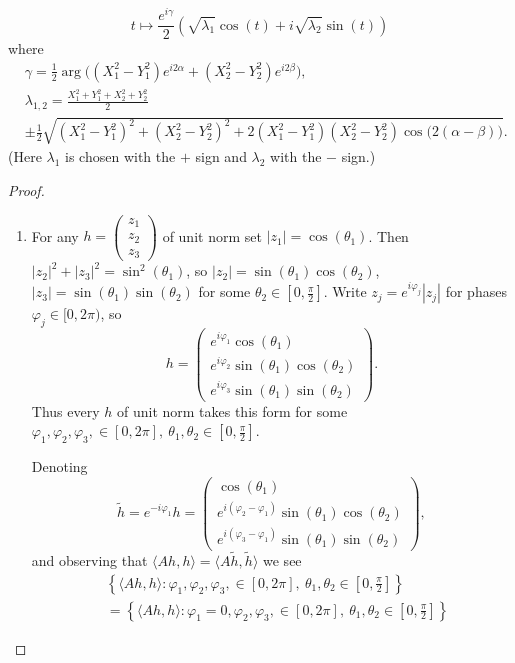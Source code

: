 \documentclass[10pt,a4paper]{amsart}
\renewcommand{\phi}{\varphi}
\begin{document}
\begin{Theorem}
\begin{enumerate}
$$
t \mapsto \frac{e^{i \gamma}}{2}\left(\sqrt{\lambda_1} \cos (t) + i \sqrt{\lambda_2}\sin (t)\right)
$$
where
\[
\begin{aligned}
&\gamma = \frac12 \arg\Big( (X_1^2-Y_1^2)e^{i2\alpha} + (X_2^2-Y_2^2)e^{i2\beta} \Big),\\
&\lambda_{1,2} = \frac{X_1^2 + Y_1^2 + X_2^2 + Y_2^2}{2} \; \\
&\pm \frac{1}{2}\sqrt{(X_1^2-Y_1^2)^2 + (X_2^2-Y_2^2)^2 + 2(X_1^2-Y_1^2)(X_2^2-Y_2^2)\cos\big(2(\alpha-\beta)\big)}.
\end{aligned}
\]
(Here $\lambda_1$ is chosen with the $+$ sign and $\lambda_2$ with the $-$ sign.)
\end{enumerate} 

\end{Theorem}

\begin{proof}


\begin{enumerate}
    \item 


For any $h = \begin{pmatrix}
    z_1 \\
    z_2 \\
    z_3
\end{pmatrix}$ of unit norm set $|z_1|=\cos (\theta_1)$. Then $|z_2|^2 + |z_3|^2 = \sin^2(\theta_1)$, so $|z_2|=\sin (\theta_1)\cos (\theta_2)$, $|z_3|=\sin (\theta_1)\sin (\theta_2)$ 
for some $\theta_2 \in[0,\tfrac{\pi}{2}]$. Write $z_j = e^{i\phi_j}|z_j|$ for phases $\phi_j\in[0,2\pi)$, 
so
\[
h=
\begin{pmatrix}
e^{i\phi_1}\cos (\theta_1) \\
e^{i\phi_2}\sin (\theta_1)\cos (\theta_2) \\
e^{i\phi_3}\sin (\theta_1)\sin (\theta_2)
\end{pmatrix}.
\]
Thus every $h$ of unit norm takes this form for some $\phi_1, \phi_2, \phi_3, \in [0, 2 \pi], \ \theta_1, \theta_2 \in [0, \frac{\pi}{2} ]$.


Denoting $$ \tilde{h} = e^{-i\phi_1}
h =  \begin{pmatrix}
\cos (\theta_1) \\
e^{i(\phi_2 - \phi_1)}\sin (\theta_1)\cos (\theta_2) \\
e^{i(\phi_3-\phi_1)}\sin (\theta_1)\sin (\theta_2)
\end{pmatrix},
$$
and observing that $\langle Ah,h \rangle  = \langle A\tilde{h},\tilde{h} \rangle$ we see
\begin{align}
&\left\{ \langle Ah,h\rangle :  \phi_1, \phi_2, \phi_3, \in [0, 2 \pi], \ \theta_1, \theta_2 \in [0, \frac{\pi}{2} ]  \right\} \\
&= \left\{ \langle Ah,h\rangle :  \phi_1=0, \phi_2, \phi_3, \in [0, 2 \pi], \ \theta_1, \theta_2 \in [0, \frac{\pi}{2} ]  \right\}
\end{align}



\end{enumerate}
\end{proof}
\end{document}
